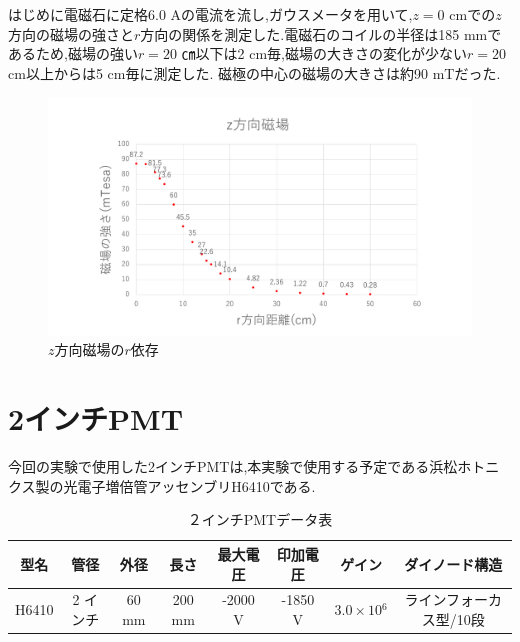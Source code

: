 \newpage
はじめに電磁石に定格6.0 Aの電流を流し,ガウスメータを用いて,$z=0$ cmでの$z$方向の磁場の強さと$r$方向の関係を測定した.電磁石のコイルの半径は185 mmであるため,磁場の強い$r=20$ ㎝以下は2 cm毎,磁場の大きさの変化が少ない$r=20$ cm以上からは5 cm毎に測定した.
磁極の中心の磁場の大きさは約90 mTだった.
\begin{figure}[h!]
	\centering
	\includegraphics[width=15cm]{fig/iguchi/maggraph01.pdf}
	\caption{$z$方向磁場の$r$依存}
	\label{maggraph01}
\end{figure}



\newpage
\section{2インチPMT}
今回の実験で使用した2インチPMTは,本実験で使用する予定である浜松ホトニクス製の光電子増倍管アッセンブリH6410\cite{pmtH6410}である.

\begin{table}[htb]
	\centering
	 \begin{tabular}{cccccccc}\hline
	型名& 管径 & 外径 & 長さ & 最大電圧 & 印加電圧 & ゲイン & ダイノード構造 \\ \hline \hline
	H6410 & 2 インチ & 60 mm & 200 mm & -2000 V & -1850 V & $3.0\times10{^{6}}$ &ラインフォーカス型/10段 \\ \hline
	\end{tabular}
	  \caption{２インチPMTデータ表}
\end{table}

